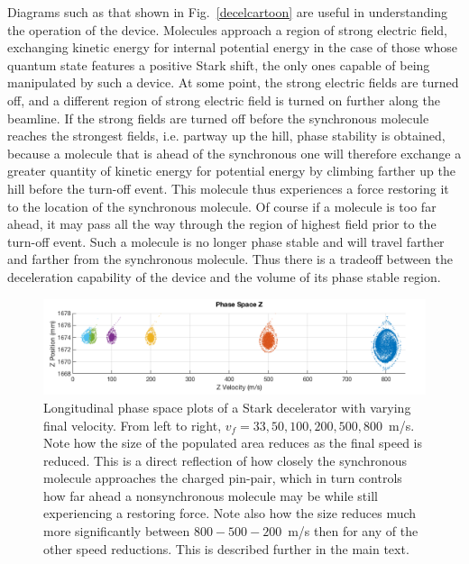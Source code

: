 Diagrams such as that shown in Fig.~\ref{decelcartoon} are useful in understanding the operation of the device.
Molecules approach a region of strong electric field, exchanging kinetic energy for internal potential energy in the case of those whose quantum state features a positive Stark shift, the only ones capable of being manipulated by such a device.
At some point, the strong electric fields are turned off, and a different region of strong electric field is turned on further along the beamline.
If the strong fields are turned off before the synchronous molecule reaches the strongest fields, i.e. partway up the hill, phase stability is obtained, because a molecule that is ahead of the synchronous one will therefore exchange a greater quantity of kinetic energy for potential energy by climbing farther up the hill before the turn-off event.
This molecule thus experiences a force restoring it to the location of the synchronous molecule.
Of course if a molecule is too far ahead, it may pass all the way through the region of highest field prior to the turn-off event. Such a molecule is no longer phase stable and will travel farther and farther from the synchronous molecule.
Thus there is a tradeoff between the deceleration capability of the device and the volume of its phase stable region.

\begin{figure}[t!]
\centering
\label{variousphaseangles}
\includegraphics[width=\linewidth]{Slowing/phaseangles.png}%
\caption{
Longitudinal phase space plots of a Stark decelerator with varying final velocity. From left to right, $v_f=33, 50, 100, 200, 500, 800$~m/s. Note how the size of the populated area reduces as the final speed is reduced.  This is a direct reflection of how closely the synchronous molecule approaches the charged pin-pair, which in turn controls how far ahead a nonsynchronous molecule may be while still experiencing a restoring force. Note also how the size reduces much more significantly between $800-500-200$~m/s then for any of the other speed reductions. This is described further in the main text. 
}
\end{figure}

